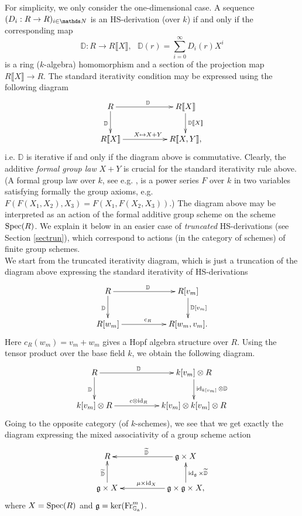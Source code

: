 \documentclass[10pt]{amsart}
\theoremstyle{definition}
\begin{document}
For simplicity, we only consider the one-dimensional case.
A sequence $(D_i:R\to R)_{i\in \Nn}$ is an HS-derivation (over $k$) if and only if the corresponding map
$$\mathbb{D}:R\to R\llbracket X\rrbracket,\ \ \ \mathbb{D}(r)=\sum_{i=0}^{\infty}D_i(r)X^i$$
is a ring ($k$-algebra) homomorphism and a section of the projection map  $R\llbracket X\rrbracket\to R$. The standard iterativity condition may be expressed using the following diagram
\begin{equation*}
\xymatrix{R \ar[rr]^{\mathbb{D}} \ar[d]_{\mathbb{D}} & & R\llbracket X\rrbracket \ar[d]^{\mathbb{D}\llbracket X\rrbracket}
 \\ R\llbracket X\rrbracket\ar[rr]^{X\mapsto X+Y} & & R\llbracket X,Y\rrbracket,}
\end{equation*}
i.e. $\mathbb{D}$ is iterative if and only if the diagram above is commutative. Clearly, the additive \emph{formal group law} $X+Y$ is crucial for the standard iterativity rule above. (A formal group law over $k$, see e.g. \cite[Chapter IV.2]{Si}, is a power series $F$ over $k$ in two variables satisfying formally the group axioms, e.g. $F(F(X_1,X_2),X_3)=F(X_1,F(X_2,X_3))$.) The diagram above may be interpreted as an action of the formal additive group scheme on the scheme $\operatorname{Spec}(R)$. We explain it below in an easier case of \emph{truncated} HS-derivations (see Section \ref{sectrun}), which correspond to actions (in the category of schemes) of finite group schemes.
\\
We start from the truncated iterativity diagram, which is just a truncation of the diagram above expressing the standard iterativity of HS-derivations
\begin{equation*}
\xymatrix{R \ar[rr]^{\mathbb{D}} \ar[d]_{\mathbb{D}} & & R[v_m] \ar[d]^{\mathbb{D}[v_m]}
 \\ R[w_m]\ar[rr]^{c_R} & & R[w_m,v_m].}
\end{equation*}
Here $c_R(w_m)=v_m+w_m$ gives a Hopf algebra structure over $R$. Using the tensor product over the base field $k$, we obtain the following diagram.
\begin{equation*}
\xymatrix{R \ar[rr]^{\mathbb{D}\ \ \ \ } \ar[d]_{\mathbb{D}} & & k[v_m]\otimes R \ar[d]^{\id_{k[v_m]}\otimes \mathbb{D}}
 \\ k[v_m]\otimes R\ar[rr]^{c\otimes \id_R\ \ \ \ } & & k[v_m]\otimes k[v_m]\otimes R}
\end{equation*}
Going to the opposite category (of $k$-schemes), we see that we get exactly the diagram expressing the mixed associativity of a group scheme action
\begin{equation*}
\xymatrix{R  & & \ar[ll]_{\widetilde{\mathbb{D}}}  \mathfrak{g}\times X
 \\ \mathfrak{g}\times X  \ar[u]^{\widetilde{\mathbb{D}}} & & \ar[ll]_{\mu \times \id_X} \ar[u]_{\id_{\mathfrak{g}}\times \widetilde{\mathbb{D}}} \mathfrak{g}\times \mathfrak{g}\times X,}
\end{equation*}
where $X=\operatorname{Spec}(R)$ and $\mathfrak{g}=\ker(\operatorname{Fr}^m_{\mathbb{G}_{\rm{a}}})$.
\end{document}
